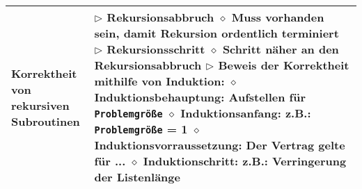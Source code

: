 \begin{longtable}{ | p{} p{} | }
	\makecell[l]{Korrektheit von \\ rekursiven Subroutinen} & \makecell[l]{
	$\rhd$ Rekursionsabbruch \\
	\hspace{0.4cm} $\diamond$ Muss vorhanden sein, damit Rekursion ordentlich terminiert \\
	$\rhd$ Rekursionsschritt \\
	\hspace{0.4cm} $\diamond$ Schritt näher an den Rekursionsabbruch \\
	$\rhd$ Beweis der Korrektheit mithilfe von Induktion: \\
	\hspace{0.4cm} $\diamond$ Induktionsbehauptung: Aufstellen für \texttt{Problemgrö\ss e} \\
	\hspace{0.4cm} $\diamond$ Induktionsanfang: z.B.: \texttt{Problemgröße} = 1 \\
	\hspace{0.4cm} $\diamond$ Induktionsvorraussetzung: Der Vertrag gelte für ... \\
	\hspace{0.4cm} $\diamond$ Induktionschritt: z.B.: Verringerung der Listenlänge } \\ \hline


\end{longtable}
